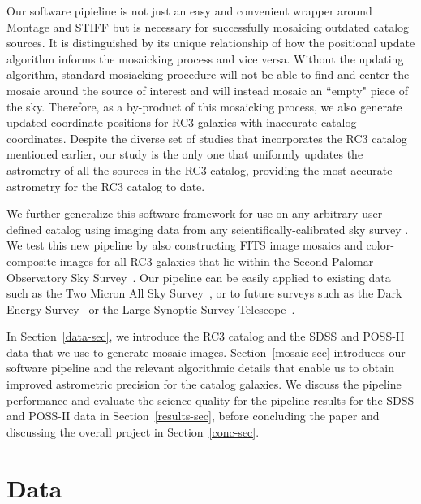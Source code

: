 \documentclass[authoryear, 12pt, 5p, times]{elsarticle}
\begin{document}
Our software pipieline is not just an easy and convenient  wrapper around Montage and STIFF but is necessary for successfully mosaicing outdated catalog sources. It is distinguished by its unique relationship of how the positional update algorithm informs the mosaicking process and vice versa. Without the updating algorithm, standard mosiacking procedure will not be able to find and center the mosaic around the source of interest and will instead mosaic an ``empty" piece of the sky. Therefore, as a by-product of this mosaicking process, we also generate updated coordinate positions for RC3 galaxies with inaccurate catalog coordinates. Despite the diverse set of studies that incorporates the RC3 catalog mentioned earlier, our study is the only one that uniformly updates the astrometry of all the sources in the RC3 catalog, providing the most accurate astrometry for the RC3 catalog to date. 

 We further generalize this software framework %
 for use on any arbitrary user-defined catalog using imaging data from any scientifically-calibrated sky survey %
. We test this new pipeline by also constructing FITS image mosaics and color-composite images for all RC3 galaxies that lie within the Second Palomar Observatory Sky Survey~\citep[POSS-II;][]{poss2}. Our pipeline can be easily applied to existing data such as the Two Micron All Sky Survey~\citep[2MASS;][]{2mass}, or to future surveys such as the Dark Energy Survey~\citep[DES;][]{des} or the Large Synoptic Survey Telescope~\citep[LSST;][]{lsst}.

In Section~\ref{data-sec}, we introduce the RC3 catalog and the SDSS and POSS-II data that we use to generate mosaic images. Section~\ref{mosaic-sec} introduces our software pipeline and the relevant algorithmic details that enable us to obtain improved astrometric precision for the catalog galaxies. We discuss the pipeline performance and evaluate the science-quality for the pipeline results for the SDSS and POSS-II data in Section~\ref{results-sec}, before concluding the paper and discussing the overall project in Section~\ref{conc-sec}. 

\section{Data\label{data-sec}}
\end{document}
